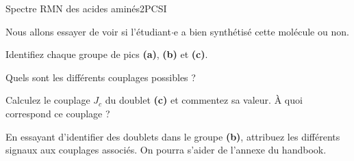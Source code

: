 \begin{exercise}{Spectre RMN des acides aminés}{2}{PCSI}
\begin{questions}
\begin{EnvUplevel}
    Nous allons essayer de voir si l'étudiant$\cdot$e a bien synthétisé cette molécule ou non.
\end{EnvUplevel}

\question Identifiez chaque groupe de pics \textbf{(a)}, \textbf{(b)} et \textbf{(c)}.

\question Quels sont les différents couplages possibles ?

\question Calculez le couplage $J_c$ du doublet \textbf{(c)} et commentez sa valeur. \`A quoi correspond ce couplage ?

\question En essayant d'identifier des doublets dans le groupe \textbf{(b)}, attribuez les différents signaux aux couplages associés. On pourra s'aider de l'annexe du handbook.

\end{questions}


\end{exercise}